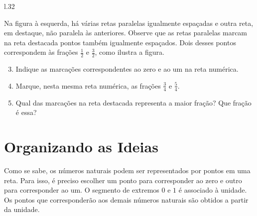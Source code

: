 \begin{atividade}{}
\begin{wrapfigure}[7]{l}{.32\linewidth}
{
}
\end{wrapfigure}

Na figura à esquerda, há várias retas paralelas igualmente espaçadas e outra reta, em destaque, não paralela às anteriores. Observe que as retas paralelas marcam na reta destacada  pontos também igualmente espaçados. Dois desses pontos correspondem às frações $\frac{1}{2}$ e $\frac{3}{2}$, como ilustra a figura.

\begin{enumerate}\setcounter{enumi}{2}
\item Indique as marcações correspondentes ao zero e ao um na reta numérica.
\end{enumerate}

\begin{enumerate}[topsep=0pt]
\setcounter{enumi}{3}

\item Marque, nesta mesma reta numérica, as  frações $\frac{3}{4}$ e $\frac{5}{4}$.

\item Qual das marcações na reta destacada representa a maior fração? Que fração é essa?
\end{enumerate} %

\end{atividade}
\clearpage

\section{Organizando as Ideias}

Como se sabe, os números naturais podem ser representados por pontos em uma reta. Para isso, é preciso escolher um ponto para corresponder ao zero e outro para corresponder ao um. O segmento de extremos $0$ e $1$ é associado à unidade. Os pontos que corresponderão aos demais números naturais são obtidos a partir da unidade.

